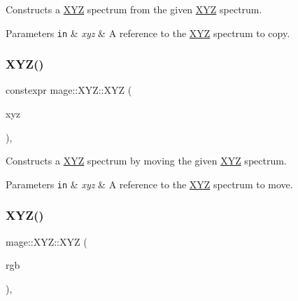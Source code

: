 Constructs a \mbox{\hyperlink{structmage_1_1_x_y_z}{X\+YZ}} spectrum from the given \mbox{\hyperlink{structmage_1_1_x_y_z}{X\+YZ}} spectrum.


\begin{DoxyParams}[1]{Parameters}
\mbox{\tt in}  & {\em xyz} & A reference to the \mbox{\hyperlink{structmage_1_1_x_y_z}{X\+YZ}} spectrum to copy. \\
\hline
\end{DoxyParams}
\mbox{\label{structmage_1_1_x_y_z_abfabc56fbe50948bc3d894178685453a}} 
\subsubsection{\texorpdfstring{X\+Y\+Z()}{XYZ()}\hspace{0.1cm}{\footnotesize\ttfamily [4/6]}}
{\footnotesize\ttfamily constexpr mage\+::\+X\+Y\+Z\+::\+X\+YZ (\begin{DoxyParamCaption}\item[{\mbox{\hyperlink{structmage_1_1_x_y_z}{X\+YZ}} \&\&}]{xyz }\end{DoxyParamCaption})\hspace{0.3cm}{\ttfamily [default]}, {\ttfamily [noexcept]}}

Constructs a \mbox{\hyperlink{structmage_1_1_x_y_z}{X\+YZ}} spectrum by moving the given \mbox{\hyperlink{structmage_1_1_x_y_z}{X\+YZ}} spectrum.


\begin{DoxyParams}[1]{Parameters}
\mbox{\tt in}  & {\em xyz} & A reference to the \mbox{\hyperlink{structmage_1_1_x_y_z}{X\+YZ}} spectrum to move. \\
\hline
\end{DoxyParams}
\mbox{\label{structmage_1_1_x_y_z_a7502d9fa2f8d6bf59d00bcdb45c4fcd0}} 
\subsubsection{\texorpdfstring{X\+Y\+Z()}{XYZ()}\hspace{0.1cm}{\footnotesize\ttfamily [5/6]}}
{\footnotesize\ttfamily mage\+::\+X\+Y\+Z\+::\+X\+YZ (\begin{DoxyParamCaption}\item[{const \mbox{\hyperlink{structmage_1_1_r_g_b}{R\+GB}} \&}]{rgb }\end{DoxyParamCaption})\hspace{0.3cm}{\ttfamily [explicit]}, {\ttfamily [noexcept]}}


